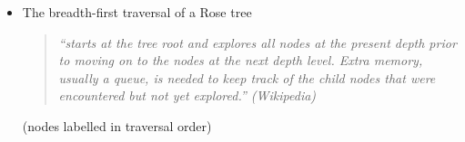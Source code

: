 \documentclass{ip3}
\begin{document}
\begin{foil}
\begin{itemize}
\item The breadth-first traversal of a Rose tree 
\begin{quote}\it
        ``starts at the tree root and explores all nodes at the present depth
        prior to moving on to the nodes at the next depth level. Extra memory,
        usually a queue, is needed to keep track of the child nodes that were
        encountered but not yet explored.'' (Wikipedia)
\end{quote}

\begin{center}

(nodes labelled in traversal order)
\end{center}
\end{itemize}
 
\end{foil}
\end{document}
